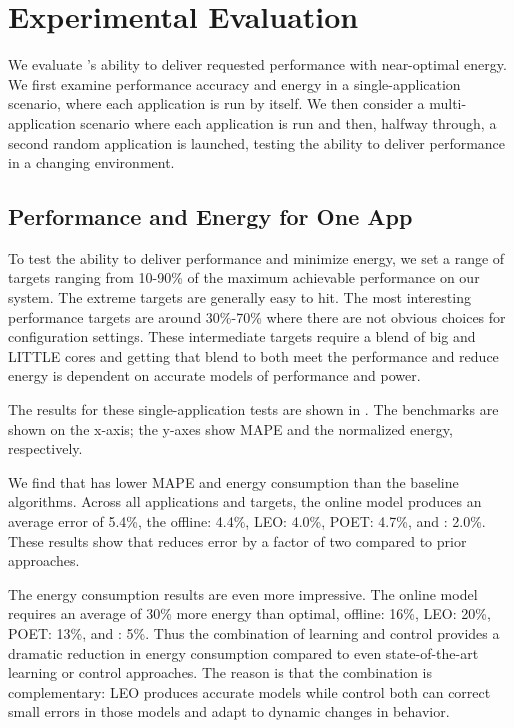 \section{Experimental Evaluation}
We evaluate \SYSTEM{}'s ability to deliver requested performance with
near-optimal energy.  We first examine performance accuracy and energy
in a single-application scenario, where each application is run by
itself.  We then consider a multi-application scenario where each
application is run and then, halfway through, a second random
application is launched, testing the ability to deliver performance in
a changing environment.  

\subsection{Performance and Energy for One App}
To test the ability to deliver performance and minimize energy, we set
a range of targets ranging from 10-90\% of the maximum achievable
performance on our system. The extreme targets are generally easy to
hit. The most interesting performance targets are around 30\%-70\%
where there are not obvious choices for configuration settings. These
intermediate targets require a blend of big and LITTLE cores and
getting that blend to both meet the performance and reduce energy is
dependent on accurate models of performance and power.

The results for these single-application tests are shown in
.  The benchmarks are shown on the
x-axis; the y-axes show MAPE and the normalized energy, respectively.

We find that \SYSTEM{} has lower MAPE and energy consumption than the
baseline algorithms. Across all applications and targets, the online
model produces an average error of 5.4\%, the offline: 4.4\%, LEO:
4.0\%, POET: 4.7\%, and \SYSTEM{}: 2.0\%.  These results show that
\SYSTEM{} reduces error by a factor of two compared to prior
approaches.  

The energy consumption results are even more impressive.  The online
model requires an average of 30\% more energy than optimal, offline:
16\%, LEO: 20\%, POET: 13\%, and \SYSTEM{}: 5\%.  Thus the combination
of learning and control provides a dramatic reduction in energy
consumption compared to even state-of-the-art learning or control
approaches.  The reason is that the combination is complementary: LEO
produces accurate models while control both can correct small errors
in those models and adapt to dynamic changes in behavior.

